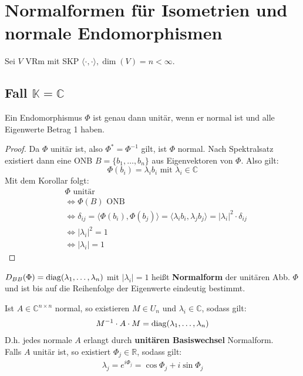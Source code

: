 \documentclass[parskip,a4paper,twoside,DIV15,BCOR12mm]{scrbook}
\begin{document}
\section{Normalformen für Isometrien und normale Endomorphismen}
Sei $V$ VRm mit SKP $\langle\cdot,\cdot\rangle, \dim(V)=n<\infty$.

\subsection{Fall $\mathbb{K}=\mathbb{C}$}
\begin{lemma}
Ein Endomorphismus $\Phi$ ist genau dann unitär, wenn er normal ist und alle Eigenwerte 
Betrag 1 haben.
\end{lemma}

\begin{proof}
Da $\Phi$ unitär ist, also $\Phi^*=\Phi^{-1}$ gilt, ist $\Phi$ normal. 
Nach Spektralsatz existiert dann eine ONB $B=\{b_1,\ldots,b_n\}$ aus Eigenvektoren von $\Phi$.
Also gilt: 
\[\Phi(b_i)=\lambda_i b_i \text{ mit } \lambda_i\in\mathbb{C}\]
Mit dem Korollar folgt:\\
\begin{align*}
&\Phi \text{ unitär}\\
&\iff \Phi(B) \text{ ONB}\\
&\iff \delta_{ij}=\langle\Phi(b_i),\Phi(b_j)\rangle=\langle\lambda_i b_i,\lambda_j b_j\rangle
=|\lambda_i|^2\cdot\delta_{ij}\\
&\iff |\lambda_i|^2=1\\
&\iff |\lambda_i|=1
\end{align*}
\end{proof}

\begin{conclusion}
$D_{BB}(\Phi)=\operatorname{diag}(\lambda_1,\ldots,\lambda_n)$ mit $|\lambda_i|=1$ heißt \textbf{Normalform}
der unitären Abb. $\Phi$ und ist bis auf die Reihenfolge der Eigenwerte eindeutig bestimmt.
\end{conclusion}

\begin{corollary}
Ist $A\in\mathbb{C}^{n\times n}$ normal, so existieren $M\in U_n$ und $\lambda_i\in\mathbb{C}$,
sodass gilt:
\begin{align*}
M^{-1}\cdot A\cdot M = \operatorname{diag}(\lambda_1,\ldots,\lambda_n)
\end{align*}
D.h. jedes normale $A$ erlangt durch \textbf{unitären Basiswechsel} Normalform.\\
Falls $A$ unitär ist, so existiert $\Phi_j\in\mathbb{R}$, sodass gilt:
\begin{align*}
\lambda_j=e^{i\Phi_j}=\cos\Phi_j+i\sin\Phi_j
\end{align*}
\end{corollary}
\end{document}
